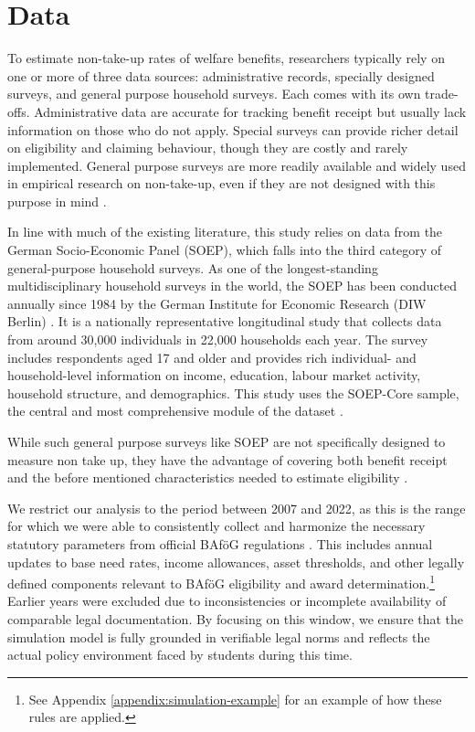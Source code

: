 \section{Data}

To estimate non-take-up rates of welfare benefits, researchers typically rely on one or more of three data sources: administrative records, specially designed surveys, and general purpose household surveys. Each comes with its own trade-offs. Administrative data are accurate for tracking benefit receipt but usually lack information on those who do not apply. Special surveys can provide richer detail on eligibility and claiming behaviour, though they are costly and rarely implemented. General purpose surveys are more readily available and widely used in empirical research on non-take-up, even if they are not designed with this purpose in mind \citep{mechelen_who_2017}.

In line with much of the existing literature, this study relies on data from the German Socio-Economic Panel (SOEP), which falls into the third category of general-purpose household surveys. As one of the longest-standing multidisciplinary household surveys in the world, the SOEP has been conducted annually since 1984 by the German Institute for Economic Research (DIW Berlin) \citep{soepcore_v39}. It is a nationally representative longitudinal study that collects data from around 30,000 individuals in 22,000 households each year. The survey includes respondents aged 17 and older and provides rich individual- and household-level information on income, education, labour market activity, household structure, and demographics. This study uses the SOEP-Core sample, the central and most comprehensive module of the dataset \citep{berlin_diw_nodate}.

While such general purpose surveys like SOEP are not specifically designed to measure non take up, they have the advantage of covering both benefit receipt and the before mentioned characteristics needed to estimate eligibility \citep{mechelen_who_2017}.

We restrict our analysis to the period between 2007 and 2022, as this is the range for which we were able to consistently collect and harmonize the necessary statutory parameters from official BAföG regulations \cite{bafoeg_law}. 
This includes annual updates to base need rates, income allowances, asset thresholds, and other legally defined components relevant to BAföG eligibility and award determination.\footnote{
  See Appendix \ref{appendix:simulation-example} for an example of how these rules are applied.
}
Earlier years were excluded due to inconsistencies or incomplete availability of comparable legal documentation. 
By focusing on this window, we ensure that the simulation model is fully grounded in verifiable legal norms and reflects the actual policy environment faced by students during this time.

